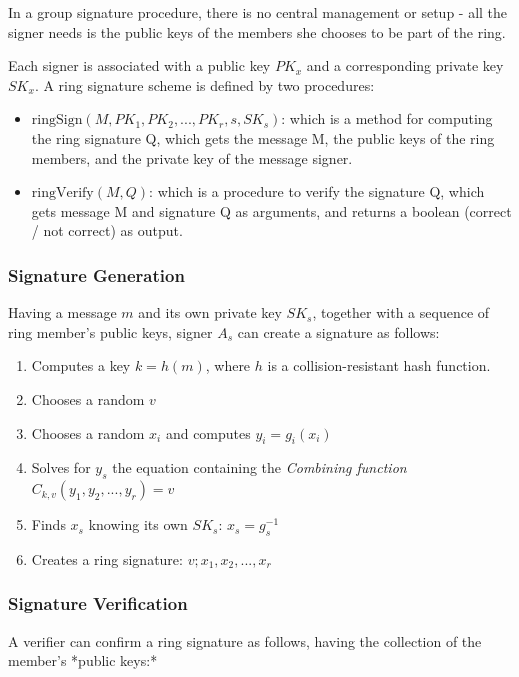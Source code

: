 In a group signature procedure, there is no central management or setup - all the signer needs is the public keys of the members she chooses to be part of the ring.

Each signer is associated with a public key $PK_x$ and a corresponding private key $SK_x$. A ring signature scheme is defined by two procedures:

\begin{itemize}
\item $\textrm{ringSign}(M, PK_1, PK_2, ..., PK_r, s, SK_s)$: which is a method for computing the ring signature Q, which gets the message M, the public keys of the ring members, and the private key of the message signer.
\item $\textrm{ringVerify}(M,Q)$: which is a procedure to verify the signature Q, which gets message M and signature Q as arguments, and returns a boolean (correct / not correct) as output.
\end{itemize}

\subsubsection{Signature Generation}

Having a message $m$ and its own private key $SK_s$, together with a sequence of ring member's public keys, signer $A_s$ can create a signature as follows:

\begin{enumerate}
\item Computes a key $k=h(m)$, where $h$ is a collision-resistant hash function.
\item Chooses a random $v$
\item Chooses a random $x_i$ and computes $y_i=g_i(x_i)$
\item Solves for $y_s$ the equation containing the \textit{Combining function} $C_{k,v}(y_1,y_2,...,y_r) = v$
\item Finds $x_s$ knowing its own $SK_s$: $x_s=g_s^{-1}$
\item Creates a ring signature: $v; x_1, x_2, ..., x_r$
\end{enumerate}

\subsubsection{Signature Verification}

A verifier can confirm a ring signature as follows, having the collection of the member's *public keys:*

